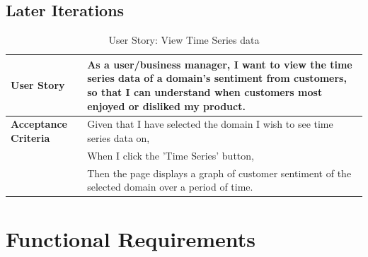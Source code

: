 \documentclass[12pt]{article}
\begin{document}
\subsection{Later Iterations}
\begin{table}[htbp]
\caption{User Story: View Time Series data}
\begin{tabular}{|p{}|p{}|}
\hline
\textbf{User Story} & As a user/business manager, I want to view the time series data of a domain's sentiment from customers, so that I can understand when customers most enjoyed or disliked my product. \\
\hline
\textbf{Acceptance Criteria} & 
Given that I have selected the domain I wish to see time series data on,\\
& When I click the 'Time Series' button,\\
& Then the page displays a graph of customer sentiment of the selected domain over a period of time. \\
\hline
\end{tabular}
\end{table}

\newpage

\section{Functional Requirements}
\end{document}
